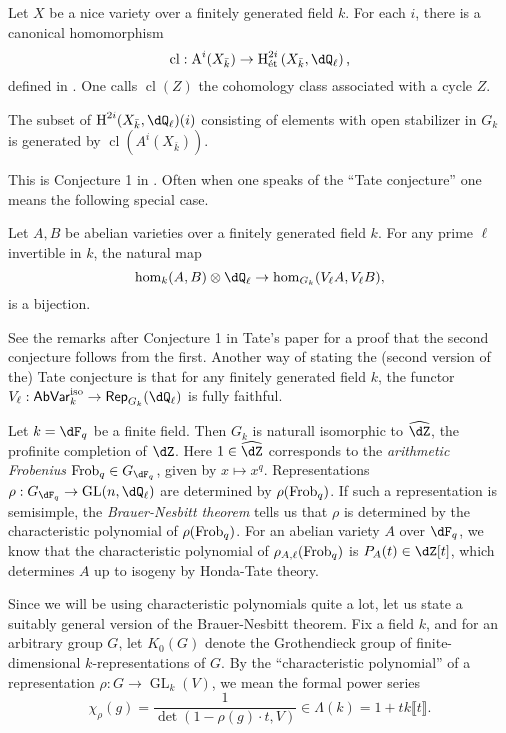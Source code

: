 Let $X$ be a nice variety over a finitely generated field $k$. For each $i$, 
there is a canonical homomorphism 
\[
  \operatorname{cl}:\chow^i(X_{\bar k}) \to \h_\text{\'et}^{2 i}\left(X_{\bar k},\dQ_\ell\right)\text{,}
\]
defined in \cite[VI 2.2.10]{de77}. One calls $\operatorname{cl}(Z)$ the 
cohomology class associated with a cycle $Z$. 

\begin{conjecture}[Tate]
The subset of $\h^{2 i}(X_{\bar k},\dQ_\ell)(i)$ consisting of elements with 
open stabilizer in $G_k$ is generated by $\operatorname{cl}(A^i(X_{\bar k}))$. 
\end{conjecture}

This is Conjecture 1 in \cite{ta65}. Often when one speaks of the ``Tate 
conjecture'' one means the following special case. 

\begin{conjecture}[Tate]
Let $A,B$ be abelian varieties over a finitely generated field $k$. For any 
prime $\ell$ invertible in $k$, the natural map 
\[
  \hom_k(A,B)\otimes\dQ_\ell \to \hom_{G_k}(V_\ell A, V_\ell B) \text{,}
\]
is a bijection. 
\end{conjecture}

See the remarks after Conjecture 1 in Tate's paper for a proof that the second 
conjecture follows from the first. Another way of stating the (second version 
of the) Tate conjecture is that for any finitely generated field $k$, the 
functor $V_\ell:\mathsf{AbVar}_k^\text{iso} \to \mathsf{Rep}_{G_k}(\dQ_\ell)$ 
is fully faithful. 

\begin{example}
Let $k=\dF_q$ be a finite field. Then $G_k$ is naturall isomorphic to 
$\widehat\dZ$, the profinite completion of $\dZ$. Here $1\in \widehat\dZ$ 
corresponds to the \emph{arithmetic Frobenius} $\frob_q\in G_{\dF_q}$, given by 
$x\mapsto x^q$. Representations 
$\rho:G_{\dF_q} \to \operatorname{GL}(n,\dQ_\ell)$ are determined by 
$\rho(\mathrm{Frob}_q)$. If such a representation is semisimple, the 
\emph{Brauer-Nesbitt theorem} tells us that $\rho$ is determined by the 
characteristic polynomial of $\rho(\mathrm{Frob}_q)$. For an abelian variety $A$ over 
$\dF_q$, we know that the characteristic polynomial of 
$\rho_{A,\ell}(\mathrm{Frob}_q)$ is $P_A(t)\in \dZ[t]$, which determines $A$ up to 
isogeny by Honda-Tate theory. 
\end{example}

Since we will be using characteristic polynomials quite a lot, let us state a 
suitably general version of the Brauer-Nesbitt theorem. Fix a field $k$, and 
for an arbitrary group $G$, let $K_0(G)$ denote the Grothendieck group of 
finite-dimensional $k$-representations of $G$. By the ``characteristic 
polynomial'' of a representation $\rho:G \to \operatorname{GL}_k(V)$, we mean 
the formal power series 
\[
  \chi_\rho(g) = \frac{1}{\det(1-\rho(g)\cdot t, V)} \in \Lambda(k) = 1+t k\llbracket t\rrbracket \text{.}
\]

